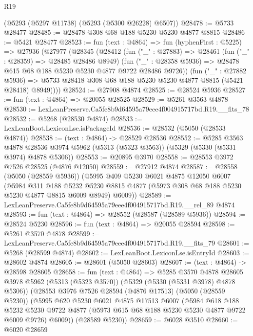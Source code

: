 \begin{lexlean}{R19}
\begin{coremodule}
    (@5293 (@5297 @11738) (@5293 (@5300 @26228) @6507))
@28478 := @5733 @28477
@28485 := @28478 @308 @68 @188 @5230 @5230 @4877 @8815
@28486 := @5421 @28477
@28523 := fun (text : @4864) =>
  fun (hyphenFirst : @5225) =>
  @27936
    (@27977
      (@28345
        (@28412
          (fun ("_" : @27883) =>
          @28461
            (fun ("_" : @28359) => @28485 @28486 @8949)
            (fun ("_" : @28358 @5936) => @28478 @615 @68 @188 @5230 @5230 @4877 @9722 @28486 @9726))
          (fun ("_" : @27882 @5936) =>
          @5733 @28418 @308 @68 @188 @5230 @5230 @4877 @8815 (@5421 @28418) @8949))))
@28524 := @27908 @4874
@28525 := @28524 @5936
@28527 := fun (text : @4864) => @20055 @28525
@28529 := @5261 @3563 @4878
@28530 := LexLeanPreserve.Ca5fe8b9d64595a79eee4f004915717bd.R19.__fits_78
@28532 := @5268 (@28530 @4874)
@28533 := LexLeanBoot.LexiconLse.isPackageId
@28536 := @28532 (@5050 (@28533 @4874))
@28538 := (text : @4864) -> @28529 @28536
@28552 := @5285
    @3563
    @4878
    @28536
    @3974
    @5962
    (@5313 (@5323 @3563))
    (@5329 (@5330 (@5331 @3974) @4878 @5306))
@28553 := @20895 @3970
@28558 := @28553 @3972 @7526 @28525 (@4876 @12050)
@28559 := @27912 @4874
@28587 := @28558
    (@5050 (@28559 @5936))
    (@5995
      @409
      @5230
      @6021
      @4875
      @12050
      @6007
      (@5984
        @311
        @188
        @5232
        @5230
        @8815
        @4877
        (@5973 @308 @68 @188 @5230 @5230 @4877 @8815 @6009 @8949)
        @6009))
@28589 := LexLeanPreserve.Ca5fe8b9d64595a79eee4f004915717bd.R19.__rel_89 @4874
@28593 := fun (text : @4864) => @28552 (@28587 (@28589 @5936))
@28594 := @28524 @5230
@28596 := fun (text : @4864) => @20055 @28594
@28598 := @5261 @3570 @4878
@28599 := LexLeanPreserve.Ca5fe8b9d64595a79eee4f004915717bd.R19.__fits_79
@28601 := @5268 (@28599 @4874)
@28602 := LexLeanBoot.LexiconLse.isEntryId
@28603 := @28602 @4874
@28605 := @28601 (@5050 @28603)
@28607 := (text : @4864) -> @28598 @28605
@28658 := fun (text : @4864) =>
  @5285
    @3570
    @4878
    @28605
    @3978
    @5962
    (@5313 (@5323 @3570))
    (@5329 (@5330 (@5331 @3978) @4878 @5306))
    (@28553
      @3976
      @7526
      @28594
      (@4876 @17513)
      (@5050 (@28559 @5230))
      (@5995
        @620
        @5230
        @6021
        @4875
        @17513
        @6007
        (@5984
          @618
          @188
          @5232
          @5230
          @9722
          @4877
          (@5973 @615 @68 @188 @5230 @5230 @4877 @9722 @6009 @9726)
          @6009))
      (@28589 @5230))
@28659 := @6028 @3510
@28660 := @6020 @28659

\end{coremodule}
\end{lexlean}

